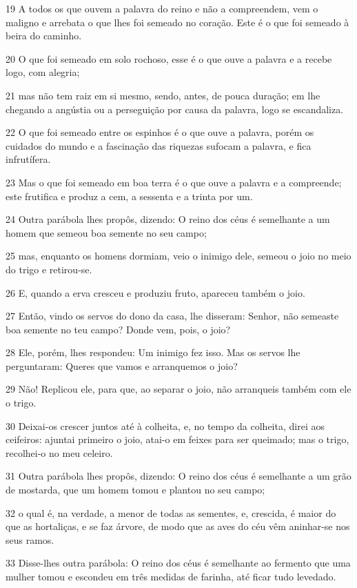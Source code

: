 \par 19 A todos os que ouvem a palavra do reino e não a compreendem, vem o maligno e arrebata o que lhes foi semeado no coração. Este é o que foi semeado à beira do caminho.
\par 20 O que foi semeado em solo rochoso, esse é o que ouve a palavra e a recebe logo, com alegria;
\par 21 mas não tem raiz em si mesmo, sendo, antes, de pouca duração; em lhe chegando a angústia ou a perseguição por causa da palavra, logo se escandaliza.
\par 22 O que foi semeado entre os espinhos é o que ouve a palavra, porém os cuidados do mundo e a fascinação das riquezas sufocam a palavra, e fica infrutífera.
\par 23 Mas o que foi semeado em boa terra é o que ouve a palavra e a compreende; este frutifica e produz a cem, a sessenta e a trinta por um.
\par 24 Outra parábola lhes propôs, dizendo: O reino dos céus é semelhante a um homem que semeou boa semente no seu campo;
\par 25 mas, enquanto os homens dormiam, veio o inimigo dele, semeou o joio no meio do trigo e retirou-se.
\par 26 E, quando a erva cresceu e produziu fruto, apareceu também o joio.
\par 27 Então, vindo os servos do dono da casa, lhe disseram: Senhor, não semeaste boa semente no teu campo? Donde vem, pois, o joio?
\par 28 Ele, porém, lhes respondeu: Um inimigo fez isso. Mas os servos lhe perguntaram: Queres que vamos e arranquemos o joio?
\par 29 Não! Replicou ele, para que, ao separar o joio, não arranqueis também com ele o trigo.
\par 30 Deixai-os crescer juntos até à colheita, e, no tempo da colheita, direi aos ceifeiros: ajuntai primeiro o joio, atai-o em feixes para ser queimado; mas o trigo, recolhei-o no meu celeiro.
\par 31 Outra parábola lhes propôs, dizendo: O reino dos céus é semelhante a um grão de mostarda, que um homem tomou e plantou no seu campo;
\par 32 o qual é, na verdade, a menor de todas as sementes, e, crescida, é maior do que as hortaliças, e se faz árvore, de modo que as aves do céu vêm aninhar-se nos seus ramos.
\par 33 Disse-lhes outra parábola: O reino dos céus é semelhante ao fermento que uma mulher tomou e escondeu em três medidas de farinha, até ficar tudo levedado.
